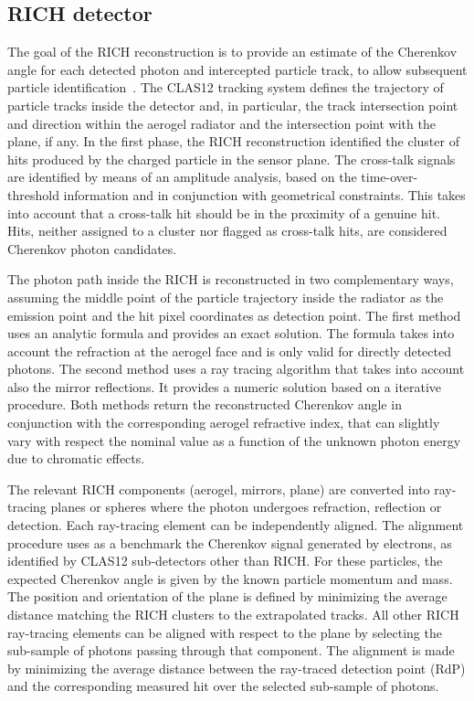 \subsection{RICH detector}

The goal of the RICH reconstruction is to provide an estimate of the Cherenkov angle for each detected photon and intercepted particle track, to allow subsequent particle identification~\cite{rich-nim}. The CLAS12 tracking system defines the trajectory of particle tracks inside the detector and, in particular, the track intersection point and direction within the aerogel radiator and the intersection point with the \MaPMT plane, if any. In the first phase, the RICH reconstruction identified the cluster of hits produced by the charged particle in the sensor plane. The cross-talk signals are identified by means of an amplitude analysis, based on the time-over-threshold information and in conjunction with geometrical constraints. This takes into account that a cross-talk hit should be in the proximity of a genuine hit. Hits, neither assigned to a cluster nor flagged as cross-talk hits, are considered Cherenkov photon candidates. 

The photon path inside the RICH is reconstructed in two complementary ways, assuming the middle point of the particle trajectory inside the radiator as the emission point and the hit pixel coordinates as detection point. The first method uses an analytic formula and provides an exact solution. The formula takes into account the refraction at the aerogel face and is only valid for directly detected photons. The second method uses a ray tracing algorithm that takes into account also the mirror reflections. It provides a numeric solution based on a iterative procedure. Both methods return the reconstructed Cherenkov angle in conjunction with the corresponding aerogel refractive index, that can slightly vary with respect the nominal value as a function of the unknown photon energy due to chromatic effects. 

The relevant RICH components (aerogel, mirrors, \MaPMT plane) are converted into ray-tracing planes or spheres where the photon undergoes refraction, reflection or detection. Each ray-tracing element can be independently aligned. The alignment procedure uses as a benchmark the Cherenkov signal generated by electrons, as identified by CLAS12 sub-detectors other than RICH. For these particles, the expected Cherenkov angle is given by the known particle momentum and mass. The position and orientation of the \MaPMT plane is defined by minimizing the average distance matching the RICH clusters to the extrapolated tracks. All other RICH ray-tracing elements can be aligned with respect to the \MaPMT plane by selecting the sub-sample of photons passing through that component. The alignment is made by minimizing the average distance between the ray-traced detection point (RdP) and the corresponding measured \MaPMT hit over the selected sub-sample of photons.

